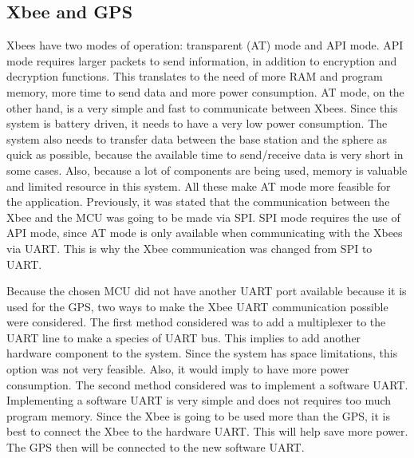 
\subsection{Xbee and GPS}

Xbees have two modes of operation: transparent (AT) mode and API mode. API mode requires larger packets to send information, in addition to encryption and decryption functions.  This translates to the need of more RAM and program memory, more time to send data and more power consumption.  AT mode, on the other hand, is a very simple and fast to communicate between Xbees. Since this system is battery driven, it needs to have a very low power consumption.  The system also needs to transfer data between the base station and the sphere as quick as possible, because the available time to send/receive data is very short in some cases.  Also, because a lot of components are being used, memory is valuable and limited resource in this system. All these make AT mode more feasible for the application. Previously, it was stated that the communication between the Xbee and the MCU was going to be made via SPI. SPI mode requires the use of API mode, since AT mode is only available when communicating with the Xbees via UART. This is why the Xbee communication was changed from SPI to UART.

Because the chosen MCU did not have another UART port available because it is used for the GPS, two ways to make the Xbee UART communication possible were considered.  The first method considered was to add a multiplexer to the UART line to make a species of UART bus.  This implies to add another hardware component to the system.  Since the system has space limitations, this option was not very feasible.  Also, it would imply to have more power consumption.  The second method considered was to implement a software UART.  Implementing a software UART is very simple and does not requires too much program memory. Since the Xbee is going to be used more than the GPS, it is best to connect the Xbee to the hardware UART.  This will help save more power.  The GPS then will be connected to the new software UART.